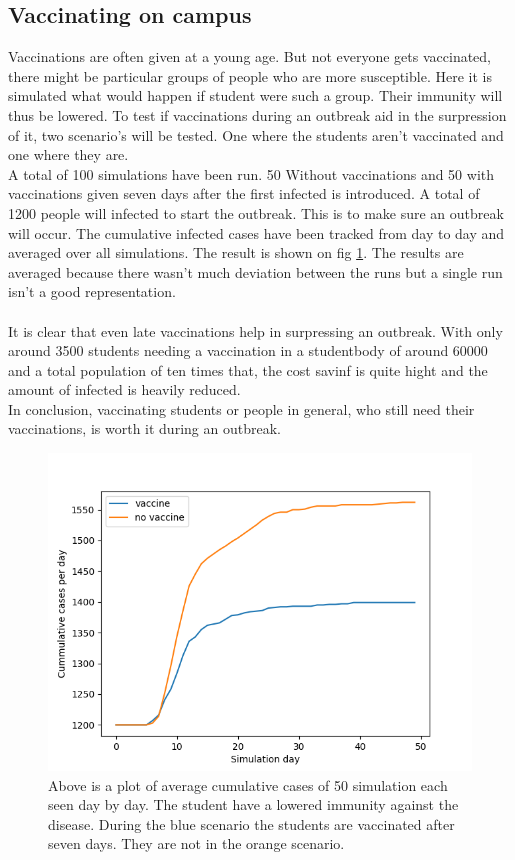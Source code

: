 \documentclass[runningheads]{llncs}
\begin{document}
	\subsection{Vaccinating on campus}
	Vaccinations are often given at a young age. But not everyone gets vaccinated, there might be particular groups of people who are more susceptible. Here it is simulated what would happen if student were such a group. Their immunity will thus be lowered. To test if vaccinations during an outbreak aid in the surpression of it, two scenario's will be tested. One where the students aren't vaccinated and one where they are.\\
	A total of 100 simulations have been run. 50 Without vaccinations and 50 with vaccinations given seven days after the first infected is introduced. A total of 1200 people will infected to start the outbreak. This is to make sure an outbreak will occur. The cumulative infected cases have been tracked from day to day and averaged over all simulations. The result is shown on fig \ref{vax_campus}. The results are averaged because there wasn't much deviation between the runs but a single run isn't a good representation.\\ \\
	It is clear that even late vaccinations help in surpressing an outbreak. With only around 3500 students needing a vaccination in a studentbody of around 60000 and a total population of ten times that, the cost savinf is quite hight and the amount of infected is heavily reduced. \\
	In conclusion, vaccinating students or people in general, who still need their vaccinations, is worth it during an outbreak.
	
	\begin{figure}[h!]
		\includegraphics[width=\textwidth]{student_vaccinations.png}
		\caption{Above is a plot of average cumulative cases of 50 simulation each seen day by day. The student have a lowered immunity against the disease. During the blue scenario the students are vaccinated after seven days. They are not in the orange scenario.}
		\label{vax_campus}
	\end{figure}
	\clearpage
	
\end{document}
